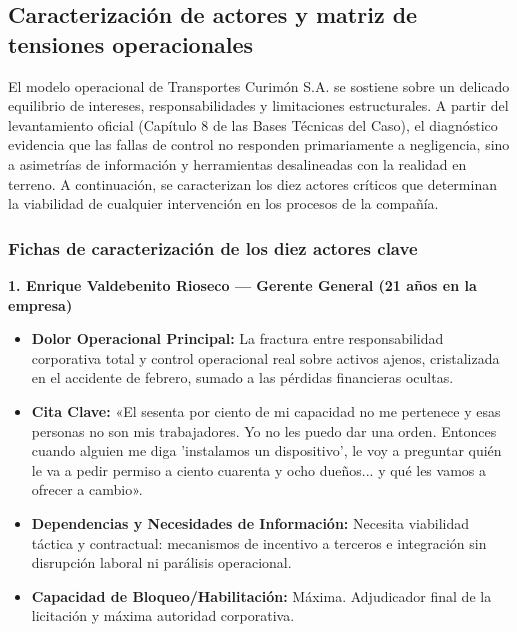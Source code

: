 \subsection{Caracterización de actores y matriz de tensiones operacionales}

El modelo operacional de Transportes Curimón S.A. se sostiene sobre un delicado equilibrio de intereses, responsabilidades y limitaciones estructurales. A partir del levantamiento oficial (Capítulo 8 de las Bases Técnicas del Caso), el diagnóstico evidencia que las fallas de control no responden primariamente a negligencia, sino a asimetrías de información y herramientas desalineadas con la realidad en terreno. A continuación, se caracterizan los diez actores críticos que determinan la viabilidad de cualquier intervención en los procesos de la compañía.

\subsubsection{Fichas de caracterización de los diez actores clave}

\textbf{1. Enrique Valdebenito Rioseco --- Gerente General (21 años en la empresa)}
\begin{itemize}
    \item \textbf{Dolor Operacional Principal:} La fractura entre responsabilidad corporativa total y control operacional real sobre activos ajenos, cristalizada en el accidente de febrero, sumado a las pérdidas financieras ocultas.
    \item \textbf{Cita Clave:} «El sesenta por ciento de mi capacidad no me pertenece y esas personas no son mis trabajadores. Yo no les puedo dar una orden. Entonces cuando alguien me diga 'instalamos un dispositivo', le voy a preguntar quién le va a pedir permiso a ciento cuarenta y ocho dueños... y qué les vamos a ofrecer a cambio».
    \item \textbf{Dependencias y Necesidades de Información:} Necesita viabilidad táctica y contractual: mecanismos de incentivo a terceros e integración sin disrupción laboral ni parálisis operacional.
    \item \textbf{Capacidad de Bloqueo/Habilitación:} Máxima. Adjudicador final de la licitación y máxima autoridad corporativa.
\end{itemize}

